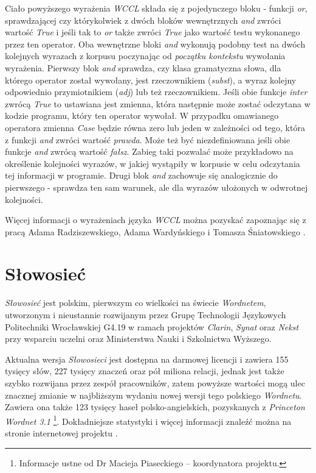 \par
Ciało powyższego wyrażenia \emph{WCCL} składa się z pojedynczego bloku - funkcji \emph{or}, sprawdzającej czy którykolwiek z dwóch bloków wewnętrznych \emph{and} zwróci wartość \emph{True} i jeśli tak to \emph{or} także zwróci \emph{True} jako wartość testu wykonanego przez ten operator.
Oba wewnętrzne bloki \emph{and} wykonują podobny test na dwóch kolejnych wyrazach z korpusu poczynając od \emph{początku kontekstu} wywołania wyrażenia.
Pierwszy blok \emph{and} sprawdza, czy klasa gramatyczna słowa, dla którego operator został wywołany, jest rzeczownikiem (\emph{subst}), a wyraz kolejny odpowiednio przymiotnikiem (\emph{adj}) lub też rzeczownikiem.
Jeśli obie funkcje \emph{inter} zwrócą \emph{True} to ustawiana jest zmienna, która następnie może zostać odczytana w kodzie programu, który ten operator wywołał.
W przypadku omawianego operatora zmienna \emph{Case} będzie równa zero lub jeden w zależności od tego, która z funkcji \emph{and} zwróci wartość \emph{prawda}.
Może też być niezdefiniowana jeśli obie funkcje \emph{and} zwrócą wartość \emph{fałsz}.
Zabieg taki pozwalać może przykładowo na określenie kolejności wyrazów, w jakiej wystąpiły w korpusie w celu odczytania tej informacji w programie.
Drugi blok \emph{and} zachowuje się analogicznie do pierwszego - sprawdza ten sam warunek, ale dla wyrazów ułożonych w odwrotnej kolejności.

\par
Więcej informacji o wyrażeniach języka \emph{WCCL} można pozyskać zapoznając się z pracą Adama Radziszewskiego, Adama Wardyńskiego i Tomasza Śniatowskiego \cite{wccl}.

\section{Słowosieć}
\emph{Słowosieć} \cite{slowosiec} jest polskim, pierwszym co wielkości na świecie \emph{Wordnetem}, utworzonym i nieustannie rozwijanym przez Grupę Technologii Językowych Politechniki Wrocławskiej G4.19 w ramach projektów \emph{Clarin}, \emph{Synat} oraz \emph{Nekst} przy wsparciu uczelni oraz Ministerstwa Nauki i Szkolnictwa Wyższego.

\par
Aktualna wersja \emph{Słowosieci} jest dostępna na darmowej licencji i zawiera 155 tysięcy słów, 227 tysięcy znaczeń oraz pół miliona relacji, jednak jest także szybko rozwijana przez zespół pracowników, zatem powyższe wartości mogą ulec znacznej zmianie w najbliższym wydaniu nowej wersji tego polskiego \emph{Wordnetu}.
Zawiera ona także 123 tysięcy haseł polsko-angielskich, pozyskanych z \emph{Princeton Wordnet 3.1} \footnote{Informacje ustne od Dr Macieja Piaseckiego -- koordynatora projektu.}.
Dokładniejsze statystyki i więcej informacji znaleźć można na stronie internetowej projektu \cite{slowosiec}.

